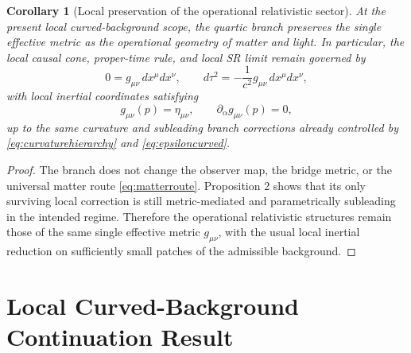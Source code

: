 \documentclass[11pt]{article}
\newtheorem{corollary}{Corollary}
\begin{document}
\begin{corollary}[Local preservation of the operational relativistic sector]
At the present local curved-background scope, the quartic branch preserves the single effective metric as the operational geometry of matter and light. In particular, the local causal cone, proper-time rule, and local SR limit remain governed by
\begin{equation}
0=g_{\mu\nu}\,dx^\mu dx^\nu,
\qquad
d\tau^2=-\frac{1}{c^2}g_{\mu\nu}\,dx^\mu dx^\nu,
\label{eq:nullproper}
\end{equation}
with local inertial coordinates satisfying
\begin{equation}
g_{\mu\nu}(p)=\eta_{\mu\nu},
\qquad
\partial_\alpha g_{\mu\nu}(p)=0,
\label{eq:localinertial}
\end{equation}
up to the same curvature and subleading branch corrections already controlled by \eqref{eq:curvaturehierarchy} and \eqref{eq:epsiloncurved}.
\end{corollary}

\begin{proof}
The branch does not change the observer map, the bridge metric, or the universal matter route \eqref{eq:matterroute}. Proposition 2 shows that its only surviving local correction is still metric-mediated and parametrically subleading in the intended regime. Therefore the operational relativistic structures remain those of the same single effective metric \(g_{\mu\nu}\), with the usual local inertial reduction on sufficiently small patches of the admissible background.
\end{proof}

\section{Local Curved-Background Continuation Result}
\end{document}
